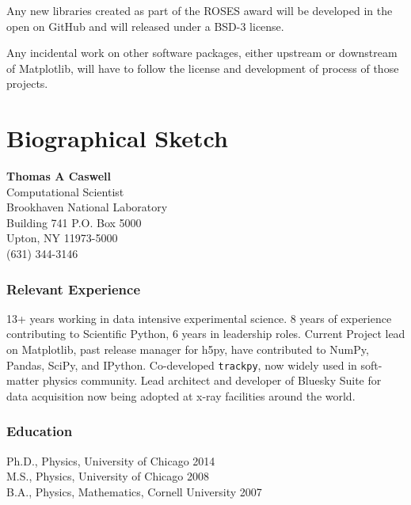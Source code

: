 \documentclass[12pt]{article}
\numberwithin{page}{section}
\begin{document}

Any new libraries created as part of the ROSES award will be developed
in the open on GitHub and will released under a BSD-3 license.

Any incidental work on other software packages, either upstream or
downstream of Matplotlib, will have to follow the license and
development of process of those projects.


\newpage
\section{Biographical Sketch}
\setcounter{page}{1}
\begin{center}
  \textbf{Thomas A Caswell}\\
  Computational Scientist\\
  Brookhaven National Laboratory\\
  Building 741 P.O. Box 5000\\
  Upton, NY 11973-5000\\
  (631) 344-3146\\
\end{center}

\subsubsection*{Relevant Experience}
13+ years working in data intensive experimental science.  8 years of
experience contributing to Scientific Python, 6 years in leadership
roles.  Current Project lead on Matplotlib, past release manager for
h5py, have contributed to NumPy, Pandas, SciPy, and IPython.
Co-developed \texttt{trackpy}, now widely used in soft-matter physics
community.  Lead architect and developer of Bluesky Suite for data
acquisition now being adopted at x-ray facilities around the world.

\subsubsection*{Education}
Ph.D., Physics, University of Chicago \hfill 2014\\
M.S., Physics, University of Chicago \hfill 2008\\
B.A., Physics, Mathematics, Cornell University \hfill 2007
\end{document}
